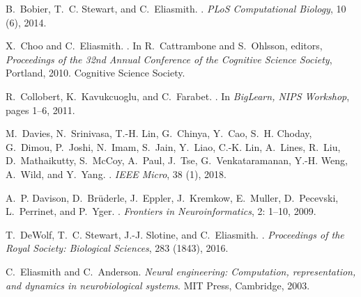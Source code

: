 \documentclass{article}
\begin{document}
\begin{thebibliography}{29}
B.~Bobier, T.~C. Stewart, and C.~Eliasmith.
.
\newblock \emph{PLoS Computational Biology}, 10 (6), 2014.

X.~Choo and C.~Eliasmith.
.
\newblock In R.~Cattrambone and S.~Ohlsson, editors, \emph{{Proceedings of the
  32nd Annual Conference of the Cognitive Science Society}}, Portland, 2010.
  Cognitive Science Society.

R.~Collobert, K.~Kavukcuoglu, and C.~Farabet.
.
\newblock In \emph{{BigLearn, NIPS Workshop}}, pages 1--6, 2011.

M.~Davies, N.~Srinivasa, T.-H. Lin, G.~Chinya, Y.~Cao, S.~H. Choday, G.~Dimou,
  P.~Joshi, N.~Imam, S.~Jain, Y.~Liao, C.-K. Lin, A.~Lines, R.~Liu,
  D.~Mathaikutty, S.~McCoy, A.~Paul, J.~Tse, G.~Venkataramanan, Y.-H. Weng,
  A.~Wild, and Y.~Yang.
.
\newblock \emph{IEEE Micro}, 38 (1), 2018.

A.~P. Davison, D.~Br{\"{u}}derle, J.~Eppler, J.~Kremkow, E.~Muller,
  D.~Pecevski, L.~Perrinet, and P.~Yger.
.
\newblock \emph{Frontiers in Neuroinformatics}, 2: 1--10, 2009.

T.~DeWolf, T.~C. Stewart, J.-J. Slotine, and C.~Eliasmith.
.
\newblock \emph{Proceedings of the Royal Society: Biological Sciences},
  283 (1843), 2016.

C.~Eliasmith and C.~Anderson.
\newblock \emph{{Neural engineering: Computation, representation, and dynamics
  in neurobiological systems}}.
\newblock MIT Press, Cambridge, 2003.


\end{thebibliography}
\end{document}
